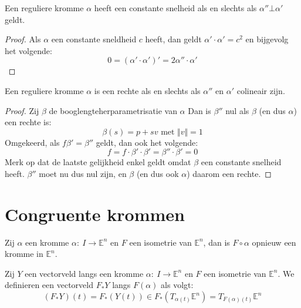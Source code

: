 \documentclass[main.tex]{subfiles}
\begin{document}
\begin{st}
  \label{st:constante-snelheid-loodrecht-op-versnelling}
  Een reguliere kromme $\alpha$ heeft een constante snelheid als en slechts als $\alpha'' \bot \alpha'$ geldt.

  \begin{proof}
    Als $\alpha$ een constante sneldheid $c$ heeft, dan geldt $\alpha'\cdot \alpha' = c^{2}$ en bijgevolg het volgende:
    \[ 0 = (\alpha'\cdot \alpha')' = 2\alpha''\cdot \alpha' \]
  \end{proof}
\end{st}

\begin{st}
  Een reguliere kromme $\alpha$ is een rechte als en slechts als $\alpha''$ en $\alpha'$ colineair zijn.

  \begin{proof}
    Zij $\beta$ de booglengteherparametrisatie van $\alpha$
    Dan is $\beta''$ nul als $\beta$ (en dus $\alpha$) een rechte is:
    \[ \beta(s) = p+sv \text{ met } \Vert v \Vert = 1 \]
    Omgekeerd, als $f\beta' = \beta''$ geldt, dan ook het volgende:
    \[ f = f \cdot \beta'\cdot \beta' = \beta''\cdot \beta' = 0 \]
    Merk op dat de laatste gelijkheid enkel geldt omdat $\beta$ een constante snelheid heeft.
    $\beta''$ moet nu dus nul zijn, en $\beta$ (en dus ook $\alpha$) daarom een rechte.
  \end{proof}
\end{st}

\section{Congruente krommen}
\label{sec:congruente-krommen}

\begin{opm}
   Zij $\alpha$ een kromme $\alpha:\ I\rightarrow \mathbb{E}^{n}$ en $F$ een isometrie van $\mathbb{E}^{n}$, dan is $F \circ \alpha$ opnieuw een kromme in $\mathbb{E}^{n}$.
\end{opm}

\begin{de}
  Zij $Y$ een vectorveld langs een kromme $\alpha:\ I\rightarrow \mathbb{E}^{n}$ en $F$ een isometrie van $\mathbb{E}^{n}$.
  We definieren een vectorveld $F_{*}Y$ langs $F(\alpha)$ als volgt:
  \[ (F_{*}Y)(t) = F_{*}(Y(t)) \in F_{*}(T_{\alpha(t)}\mathbb{E}^{n}) = T_{F(\alpha)(t)}\mathbb{E}^{n} \]
\end{de}
\end{document}
